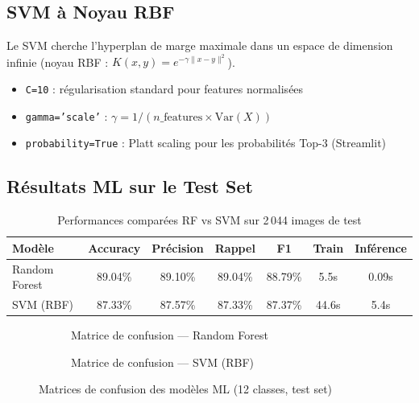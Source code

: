 \documentclass[12pt,a4paper]{article}
\begin{document}
\subsection{SVM à Noyau RBF}

Le SVM cherche l'hyperplan de marge maximale dans un espace de dimension infinie 
(noyau RBF : $K(x,y) = e^{-\gamma\|x-y\|^2}$).
\begin{itemize}
  \item \texttt{C=10} : régularisation standard pour features normalisées
  \item \texttt{gamma='scale'} : $\gamma = 1/(n\_\text{features} \times \text{Var}(X))$
  \item \texttt{probability=True} : Platt scaling pour les probabilités Top-3 (Streamlit)
\end{itemize}

\subsection{Résultats ML sur le Test Set}

\begin{table}[H]
\centering\small
\begin{tabular}{lcccccc}
\toprule
\textbf{Modèle} & \textbf{Accuracy} & \textbf{Précision} & \textbf{Rappel} & \textbf{F1} & \textbf{Train} & \textbf{Inférence} \\
\midrule
Random Forest & 89.04\% & 89.10\% & 89.04\% & 88.79\% & 5.5s & 0.09s \\
SVM (RBF)     & 87.33\% & 87.57\% & 87.33\% & 87.37\% & 44.6s & 5.4s \\
\bottomrule
\end{tabular}
\caption{Performances comparées RF vs SVM sur 2\,044 images de test}
\end{table}

\begin{figure}[H]
\centering
\begin{subfigure}{0.48\textwidth}
\caption{Matrice de confusion — Random Forest}
\end{subfigure}
\hfill
\begin{subfigure}{0.48\textwidth}
\caption{Matrice de confusion — SVM (RBF)}
\end{subfigure}
\caption{Matrices de confusion des modèles ML (12 classes, test set)}
\end{figure}
\end{document}
